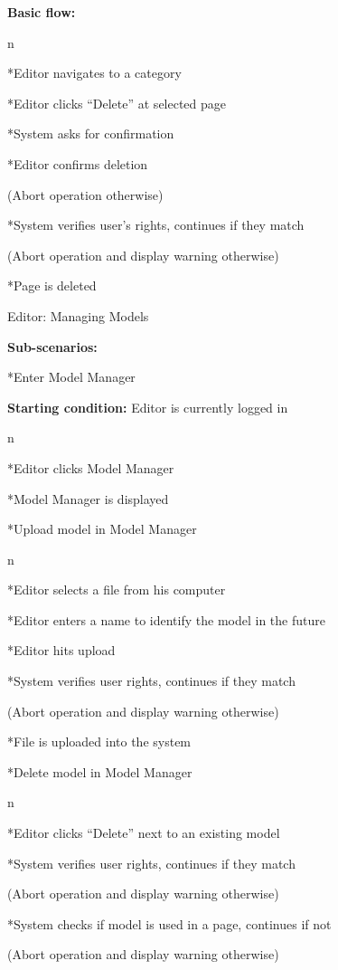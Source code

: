 {\bf Basic flow:}

\begitems \style n

*Editor navigates to a category

*Editor clicks “Delete” at selected page

*System asks for confirmation

*Editor confirms deletion

(Abort operation otherwise)

*System verifies user’s rights, continues if they match

(Abort operation and display warning otherwise)

*Page is deleted

\enditems

\secc Editor: Managing Models

{\bf Sub-scenarios:}

\begitems

*Enter Model Manager

{\bf Starting condition:} Editor is currently logged in

\begitems \style n

*Editor clicks Model Manager

*Model Manager is displayed

\enditems

*Upload model in Model Manager

\begitems \style n

*Editor selects a file from his computer

*Editor enters a name to identify the model in the future

*Editor hits upload

*System verifies user rights, continues if they match

(Abort operation and display warning otherwise)

*File is uploaded into the system

\enditems

*Delete model in Model Manager

\begitems \style n

*Editor clicks “Delete” next to an existing model

*System verifies user rights, continues if they match

(Abort operation and display warning otherwise)

*System checks if model is used in a page, continues if not

(Abort operation and display warning otherwise)

